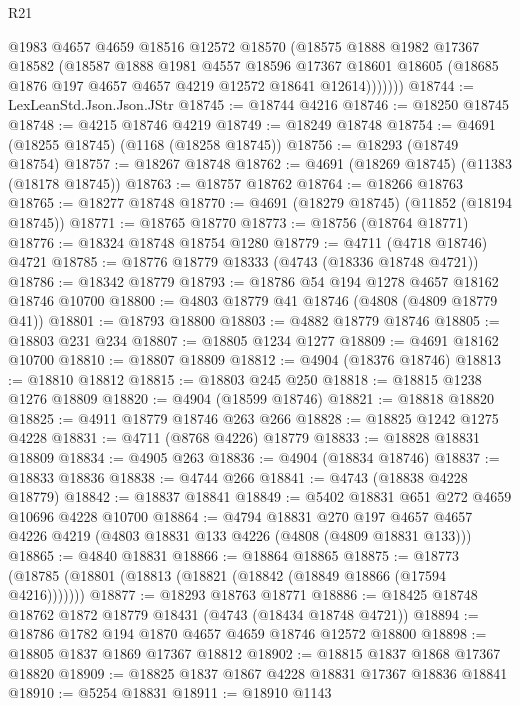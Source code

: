 \begin{lexlean}{R21}
\begin{coremodule}
            @1983
            @4657
            @4659
            @18516
            @12572
            @18570
            (@18575
              @1888
              @1982
              @17367
              @18582
              (@18587
                @1888
                @1981
                @4557
                @18596
                @17367
                @18601
                @18605
                (@18685 @1876 @197 @4657 @4657 @4219 @12572 @18641 @12614)))))))
@18744 := LexLeanStd.Json.Json.JStr
@18745 := @18744 @4216
@18746 := @18250 @18745
@18748 := @4215 @18746 @4219
@18749 := @18249 @18748
@18754 := @4691 (@18255 @18745) (@1168 (@18258 @18745))
@18756 := @18293 (@18749 @18754)
@18757 := @18267 @18748
@18762 := @4691 (@18269 @18745) (@11383 (@18178 @18745))
@18763 := @18757 @18762
@18764 := @18266 @18763
@18765 := @18277 @18748
@18770 := @4691 (@18279 @18745) (@11852 (@18194 @18745))
@18771 := @18765 @18770
@18773 := @18756 (@18764 @18771)
@18776 := @18324 @18748 @18754 @1280
@18779 := @4711 (@4718 @18746) @4721
@18785 := @18776 @18779 @18333 (@4743 (@18336 @18748 @4721))
@18786 := @18342 @18779
@18793 := @18786 @54 @194 @1278 @4657 @18162 @18746 @10700
@18800 := @4803 @18779 @41 @18746 (@4808 (@4809 @18779 @41))
@18801 := @18793 @18800
@18803 := @4882 @18779 @18746
@18805 := @18803 @231 @234
@18807 := @18805 @1234 @1277
@18809 := @4691 @18162 @10700
@18810 := @18807 @18809
@18812 := @4904 (@18376 @18746)
@18813 := @18810 @18812
@18815 := @18803 @245 @250
@18818 := @18815 @1238 @1276 @18809
@18820 := @4904 (@18599 @18746)
@18821 := @18818 @18820
@18825 := @4911 @18779 @18746 @263 @266
@18828 := @18825 @1242 @1275 @4228
@18831 := @4711 (@8768 @4226) @18779
@18833 := @18828 @18831 @18809
@18834 := @4905 @263
@18836 := @4904 (@18834 @18746)
@18837 := @18833 @18836
@18838 := @4744 @266
@18841 := @4743 (@18838 @4228 @18779)
@18842 := @18837 @18841
@18849 := @5402 @18831 @651 @272 @4659 @10696 @4228 @10700
@18864 := @4794
    @18831
    @270
    @197
    @4657
    @4657
    @4226
    @4219
    (@4803 @18831 @133 @4226 (@4808 (@4809 @18831 @133)))
@18865 := @4840 @18831
@18866 := @18864 @18865
@18875 := @18773 (@18785 (@18801 (@18813 (@18821 (@18842 (@18849 @18866 (@17594 @4216)))))))
@18877 := @18293 @18763 @18771
@18886 := @18425 @18748 @18762 @1872 @18779 @18431 (@4743 (@18434 @18748 @4721))
@18894 := @18786 @1782 @194 @1870 @4657 @4659 @18746 @12572 @18800
@18898 := @18805 @1837 @1869 @17367 @18812
@18902 := @18815 @1837 @1868 @17367 @18820
@18909 := @18825 @1837 @1867 @4228 @18831 @17367 @18836 @18841
@18910 := @5254 @18831
@18911 := @18910 @1143

\end{coremodule}
\end{lexlean}
